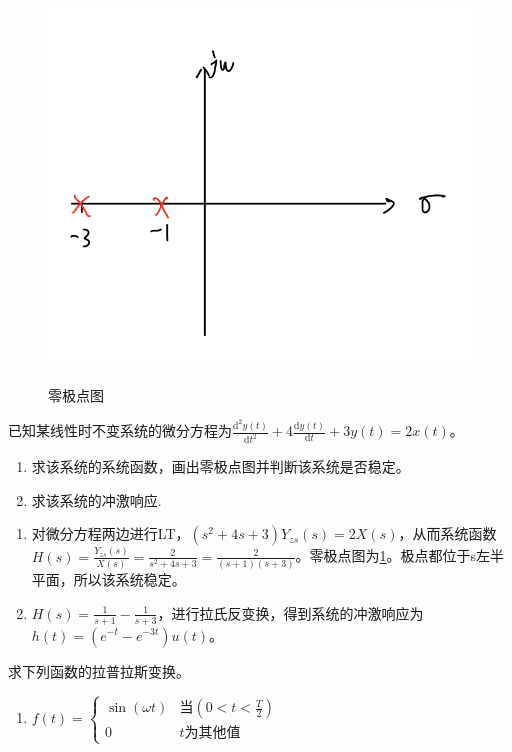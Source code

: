 \documentclass[answers]{exam}  %
\begin{document}
\begin{questions}
\begin{figure}[!h]
	\centering
	\includegraphics[width=0.5\linewidth]{pics/1.png}
	\label{Figure:q4}
	\caption{零极点图}
\end{figure}
\question 已知某线性时不变系统的微分方程为$\frac{\mathrm{d}^2y(t)}{\mathrm{d}t^2}+4\frac{\mathrm{d}y(t)}{\mathrm{d}t}+3y(t)=2x(t)$。
\begin{enumerate}[(1)]
\item 求该系统的系统函数，画出零极点图并判断该系统是否稳定。
\item 求该系统的冲激响应.
\end{enumerate}
\begin{solution}
\begin{enumerate}[(1)]
	\item 对微分方程两边进行LT，$(s^2+4s+3)Y_{zs}(s)=2X(s)$，从而系统函数$H(s)=\frac{Y_{zs}(s)}{X(s)}=\frac{2}{s^2+4s+3}=\frac{2}{(s+1)(s+3)}$。零极点图为\ref{Figure:q4}。极点都位于s左半平面，所以该系统稳定。
	\item $H(s)=\frac{1}{s+1}-\frac{1}{s+3}$，进行拉氏反变换，得到系统的冲激响应为$h(t)=(e^{-t}-e^{-3t})u(t)$。
\end{enumerate}
\end{solution}

\question 求下列函数的拉普拉斯变换。
\begin{enumerate}[(1)]
\item $f(t)=\left\{\begin{matrix}
\sin(\omega t) & \text{当}\left(0<t<\frac{T}{2} \right )\\ 
 0& t\text{为其他值}
\end{matrix}\right.$


\end{enumerate}
\end{questions}
\end{document}
